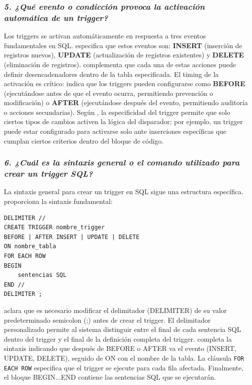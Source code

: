 \subsubsection*{\textit{5. ¿Qué evento o condicción provoca la activación automática de un trigger?}}

Los triggers se activan automáticamente en respuesta a tres eventos fundamentales en SQL. \parencite{Bosco2020} especifica que estos eventos son: \textbf{INSERT} (inserción de registros nuevos), \textbf{UPDATE} (actualización de registros existentes) y \textbf{DELETE} (eliminación de registros). \parencite{Celaya} complementa que cada una de estas acciones puede definir desencadenadores dentro de la tabla especificada. El timing de la activación es crítico: \parencite{MySQLDocumentation} indica que los triggers pueden configurarse como \textbf{BEFORE} (ejecutándose antes de que el evento ocurra, permitiendo prevención o modificación) o \textbf{AFTER} (ejecutándose después del evento, permitiendo auditoría o acciones secundarias). Según \parencite{Walther2023}, la especificidad del trigger permite que solo ciertos tipos de cambios activen la lógica del disparador; por ejemplo, un trigger puede estar configurado para activarse solo ante inserciones específicas que cumplan ciertos criterios dentro del bloque de código.

\subsubsection*{\textit{6. ¿Cuál es la sintaxis general o el comando utilizado para crear un trigger SQL?}}

La sintaxis general para crear un trigger en SQL sigue una estructura específica. \parencite{Bosco2020} proporciona la sintaxis fundamental:

\begin{verbatim}
DELIMITER //
CREATE TRIGGER nombre_trigger
BEFORE | AFTER INSERT | UPDATE | DELETE
ON nombre_tabla
FOR EACH ROW
BEGIN
    sentencias SQL
END //
DELIMITER ;
\end{verbatim}

\parencite{Celaya} aclara que es necesario modificar el delimitador (DELIMITER) de su valor predeterminado semicolon (;) antes de crear el trigger. El delimitador personalizado permite al sistema distinguir entre el final de cada sentencia SQL dentro del trigger y el final de la definición completa del trigger. \parencite{MySQLDocumentation} completa la sintaxis indicando que después de BEFORE o AFTER va el evento (INSERT, UPDATE, DELETE), seguido de ON con el nombre de la tabla. La cláusula \texttt{FOR EACH ROW} especifica que el trigger se ejecute para cada fila afectada. Finalmente, el bloque BEGIN...END contiene las sentencias SQL que se ejecutarán.

